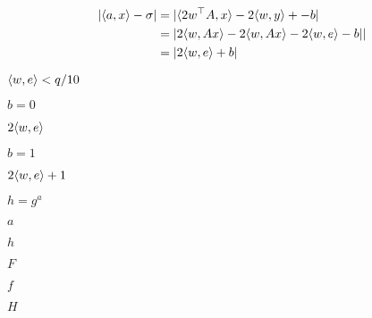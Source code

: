 \documentclass[10pt]{book}
\begin{document}
\begin{mdSnippets}
\begin{mdDisplaySnippet}
\[%
\begin{aligned}
|\iprod{a,x} - \sigma| &= |\iprod{2w^\top A, x}- 2\iprod{w,y} +- b| \\
&= |2\iprod{w,Ax} - 2\iprod{w,Ax} - 2\iprod{w,e} - b|| \\
&= |2\iprod{w,e} + b| 
\end{aligned}
\]%
\end{mdDisplaySnippet}%
\begin{mdInlineSnippet}%
$\langle w,e \rangle < q/10$\end{mdInlineSnippet}%
\begin{mdInlineSnippet}[2cd846c62474f70be3291ce24c1bcf6a]%
$b = 0$\end{mdInlineSnippet}%
\begin{mdInlineSnippet}[922dda8419f3895c96e354e4c91b4e81]%
$2\langle w,e \rangle$\end{mdInlineSnippet}%
\begin{mdInlineSnippet}[d8a35c47c0f29d1f868a2769cd3003c5]%
$b = 1$\end{mdInlineSnippet}%
\begin{mdInlineSnippet}[db8046a756b4a2a3c1ba5de7ebf64716]%
$2\langle w,e \rangle + 1$\end{mdInlineSnippet}%
\begin{mdInlineSnippet}[db8b3bf1a9c14e73f9e6ff0ebdbf00f5]%
$h=g^a$\end{mdInlineSnippet}%
\begin{mdInlineSnippet}[0cc175b9c0f1b6a831c399e269772661]%
$a$\end{mdInlineSnippet}%
\begin{mdInlineSnippet}[2510c39011c5be704182423e3a695e91]%
$h$\end{mdInlineSnippet}%
\begin{mdInlineSnippet}[800618943025315f869e4e1f09471012]%
$F$\end{mdInlineSnippet}%
\begin{mdInlineSnippet}%
$f$\end{mdInlineSnippet}%
\begin{mdInlineSnippet}[c1d9f50f86825a1a2302ec2449c17196]%
$H$\end{mdInlineSnippet}%

\end{mdSnippets}
\end{document}
